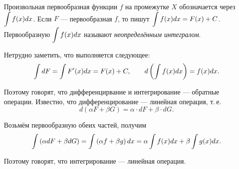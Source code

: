 Произвольная первообразная функции $f$ на промежутке $X$ обозначается через $\displaystyle\int f(x) dx$. Если $F$ --- первообразная $f$, то пишут $\displaystyle\int f(x)dx = F(x) + C$. Первообразную $\displaystyle\int f(x)dx$ называют \textit{неопределённым интегралом}.

Нетрудно заметить, что выполняется следующее:
\[
    \int dF = \int F^\prime(x)dx = F(x) + C,\qquad d\left(\int f(x)dx\right) = f(x)dx.
\]

Поэтому говорят, что дифференцирвание и интегрирование --- обратные операции. Известно, что дифференцирование --- линейная операция, т.\,е.
\[
    d(\alpha F + \beta G) = \alpha \cdot dF + \beta \cdot dG.
\]

Возьмём первообразную обеих частей, получим
\[
    \int\left(\alpha dF + \beta dG\right) = \int\left(\alpha f + \beta g\right)dx = \alpha\int f(x)dx + \beta\int g(x)dx.
\]

Поэтому говорят, что интегрирование --- линейная операция.

